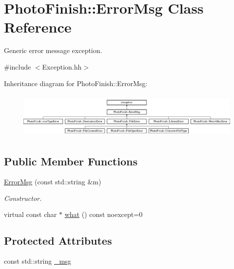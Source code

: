 \hypertarget{class_photo_finish_1_1_error_msg}{}\section{Photo\+Finish\+:\+:Error\+Msg Class Reference}
\label{class_photo_finish_1_1_error_msg}


Generic error message exception.  




{\ttfamily \#include $<$Exception.\+hh$>$}

Inheritance diagram for Photo\+Finish\+:\+:Error\+Msg\+:\begin{figure}[H]
\begin{center}
\leavevmode
\includegraphics[height=2.333333cm]{class_photo_finish_1_1_error_msg}
\end{center}
\end{figure}
\subsection*{Public Member Functions}
\begin{DoxyCompactItemize}
\item 
\hyperlink{class_photo_finish_1_1_error_msg_a3826ec6e30943811f584f93eb0247294}{Error\+Msg} (const std\+::string \&m)
\begin{DoxyCompactList}\small\item\em Constructor. \end{DoxyCompactList}\item 
virtual const char $\ast$ \hyperlink{class_photo_finish_1_1_error_msg_ae84614a0c68520a7ad11e699c1504e82}{what} () const noexcept=0
\end{DoxyCompactItemize}
\subsection*{Protected Attributes}
\begin{DoxyCompactItemize}
\item 
const std\+::string \hyperlink{class_photo_finish_1_1_error_msg_a9a91d900d61506b5f4f46759e4416d48}{\+\_\+msg}
\end{DoxyCompactItemize}


